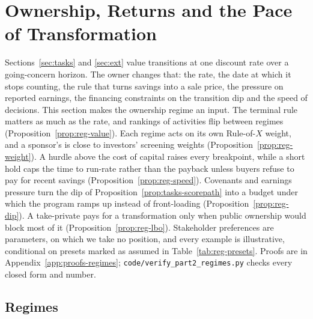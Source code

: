 \section{Ownership, Returns and the Pace of Transformation}\label{sec:regimes}

Sections~\ref{sec:tasks} and \ref{sec:ext} value transitions at one discount rate over a going-concern horizon. The owner changes that: the rate, the date at which it stops counting, the rule that turns savings into a sale price, the pressure on reported earnings, the financing constraints on the transition dip and the speed of decisions. This section makes the ownership regime an input. The terminal rule matters as much as the rate, and rankings of activities flip between regimes (Proposition~\ref{prop:reg-value}). Each regime acts on its own Rule-of-$X$ weight, and a sponsor's is close to investors' screening weights (Proposition~\ref{prop:reg-weight}). A hurdle above the cost of capital raises every breakpoint, while a short hold caps the time to run-rate rather than the payback unless buyers refuse to pay for recent savings (Proposition~\ref{prop:reg-speed}). Covenants and earnings pressure turn the dip of Proposition~\ref{prop:tasks-scorepath} into a budget under which the program ramps up instead of front-loading (Proposition~\ref{prop:reg-dip}). A take-private pays for a transformation only when public ownership would block most of it (Proposition~\ref{prop:reg-lbo}). Stakeholder preferences are parameters, on which we take no position, and every example is illustrative, conditional on presets marked as assumed in Table~\ref{tab:reg-presets}. Proofs are in Appendix~\ref{app:proofs-regimes}; \texttt{code/verify\_part2\_regimes.py} checks every closed form and number.

\subsection{Regimes}\label{sec:regimes-setup}

